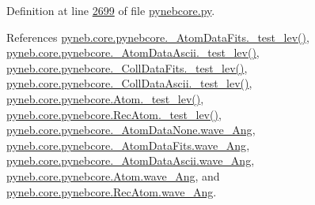 Definition at line \hyperlink{pynebcore_8py_source_l02699}{2699} of file \hyperlink{pynebcore_8py_source}{pynebcore.\-py}.



References \hyperlink{pynebcore_8py_source_l00178}{pyneb.\-core.\-pynebcore.\-\_\-\-Atom\-Data\-Fits.\-\_\-test\-\_\-lev()}, \hyperlink{pynebcore_8py_source_l00447}{pyneb.\-core.\-pynebcore.\-\_\-\-Atom\-Data\-Ascii.\-\_\-test\-\_\-lev()}, \hyperlink{pynebcore_8py_source_l00677}{pyneb.\-core.\-pynebcore.\-\_\-\-Coll\-Data\-Fits.\-\_\-test\-\_\-lev()}, \hyperlink{pynebcore_8py_source_l01045}{pyneb.\-core.\-pynebcore.\-\_\-\-Coll\-Data\-Ascii.\-\_\-test\-\_\-lev()}, \hyperlink{pynebcore_8py_source_l01525}{pyneb.\-core.\-pynebcore.\-Atom.\-\_\-test\-\_\-lev()}, \hyperlink{pynebcore_8py_source_l02672}{pyneb.\-core.\-pynebcore.\-Rec\-Atom.\-\_\-test\-\_\-lev()}, \hyperlink{pynebcore_8py_source_l00064}{pyneb.\-core.\-pynebcore.\-\_\-\-Atom\-Data\-None.\-wave\-\_\-\-Ang}, \hyperlink{pynebcore_8py_source_l00172}{pyneb.\-core.\-pynebcore.\-\_\-\-Atom\-Data\-Fits.\-wave\-\_\-\-Ang}, \hyperlink{pynebcore_8py_source_l00438}{pyneb.\-core.\-pynebcore.\-\_\-\-Atom\-Data\-Ascii.\-wave\-\_\-\-Ang}, \hyperlink{pynebcore_8py_source_l01254}{pyneb.\-core.\-pynebcore.\-Atom.\-wave\-\_\-\-Ang}, and \hyperlink{pynebcore_8py_source_l02689}{pyneb.\-core.\-pynebcore.\-Rec\-Atom.\-wave\-\_\-\-Ang}.


